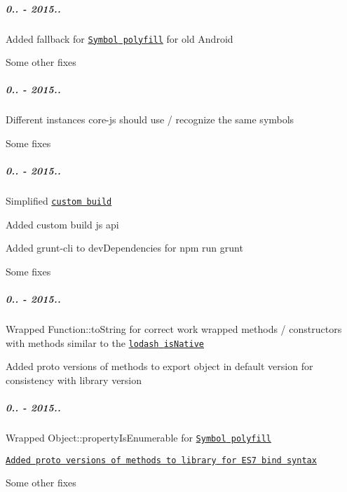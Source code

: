 \subparagraph*{0.. -\/ 2015..}


\begin{DoxyItemize}
\item Added fallback for \href{https://github.com/zloirock/core-js/#ecmascript-6-symbol}{\tt {\ttfamily Symbol} polyfill} for old Android
\item Some other fixes
\end{DoxyItemize}

\subparagraph*{0.. -\/ 2015..}


\begin{DoxyItemize}
\item Different instances {\ttfamily core-\/js} should use / recognize the same symbols
\item Some fixes
\end{DoxyItemize}

\subparagraph*{0.. -\/ 2015..}


\begin{DoxyItemize}
\item Simplified \href{https://github.com/zloirock/core-js/#custom-build}{\tt custom build}
\begin{DoxyItemize}
\item Added custom build js api
\item Added {\ttfamily grunt-\/cli} to {\ttfamily dev\+Dependencies} for {\ttfamily npm run grunt}
\end{DoxyItemize}
\item Some fixes
\end{DoxyItemize}

\subparagraph*{0.. -\/ 2015..}


\begin{DoxyItemize}
\item Wrapped {\ttfamily Function\+::to\+String} for correct work wrapped methods / constructors with methods similar to the \href{https://github.com/lodash/lodash/issues/1197}{\tt {\ttfamily lodash} {\ttfamily is\+Native}}
\item Added proto versions of methods to export object in {\ttfamily default} version for consistency with {\ttfamily library} version
\end{DoxyItemize}

\subparagraph*{0.. -\/ 2015..}


\begin{DoxyItemize}
\item Wrapped {\ttfamily Object\+::property\+Is\+Enumerable} for \href{https://github.com/zloirock/core-js/#ecmascript-6-symbol}{\tt {\ttfamily Symbol} polyfill}
\item \href{https://github.com/zloirock/core-js/issues/65}{\tt Added proto versions of methods to {\ttfamily library} for E\+S7 bind syntax}
\item Some other fixes
\end{DoxyItemize}

